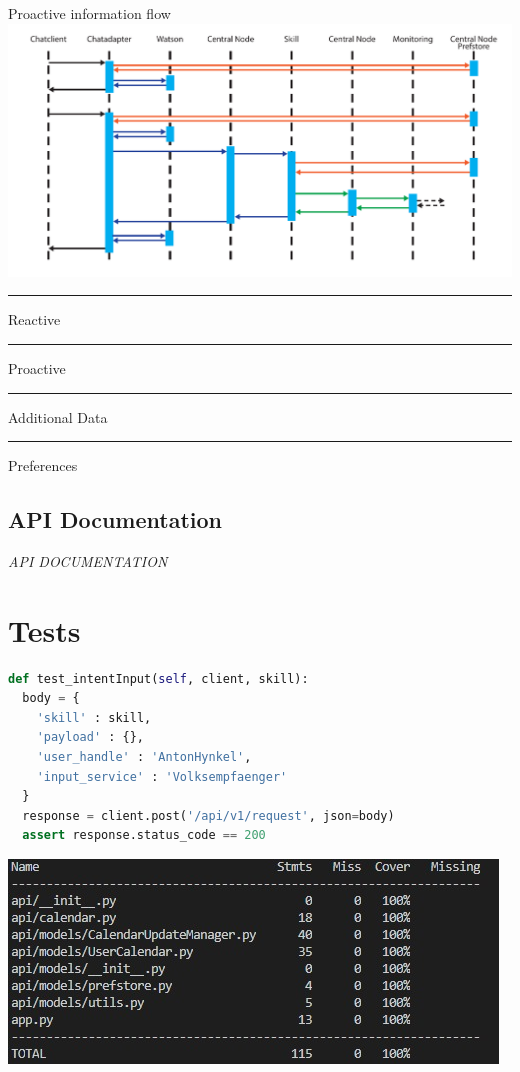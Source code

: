 \documentclass[10pt]{beamer}
\newcommand\crule[3][black]{\textcolor{#1}{\rule{#2}{#3}}}
\begin{document}
\begin{frame}{Proactive information flow}
  \includegraphics[width=\textwidth,page=2]{ProcessFlows}
  
  \crule[aswe-reactive]{0.2cm}{0.2cm} Reactive \hspace{0.3cm}
  \crule[aswe-proactive]{0.2cm}{0.2cm} Proactive \hspace{0.3cm}
  \crule[aswe-data]{0.2cm}{0.2cm} Additional Data \hspace{0.3cm}
  \crule[aswe-preferences]{0.2cm}{0.2cm} Preferences
\end{frame}

\subsection{API Documentation}

\begin{frame}
  \begin{center}
    \Large \textit{API DOCUMENTATION}
  \end{center}
\end{frame}

\section{Tests}

\begin{frame}[fragile]
  \begin{lstlisting}[language=Python,basicstyle=\footnotesize\ttfamily]
def test_intentInput(self, client, skill):
  body = {
    'skill' : skill,
    'payload' : {},
    'user_handle' : 'AntonHynkel',
    'input_service' : 'Volksempfaenger'
  }
  response = client.post('/api/v1/request', json=body)
  assert response.status_code == 200
  \end{lstlisting}
  \includegraphics[width=\textwidth]{CodeCoverage}
\end{frame}
\end{document}
